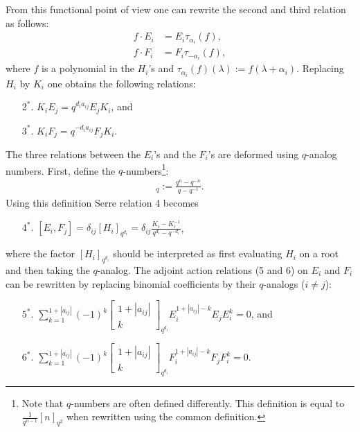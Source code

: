 \begin{construct}
        From this functional point of view one can rewrite the second and third relation as follows:
        \begin{align*}
            f\cdot E_i &= E_i\tau_{\alpha_i}(f),\\
            f\cdot F_i &= F_i\tau_{-\alpha_i}(f),
        \end{align*}
        where $f$ is a polynomial in the $H_i$'s and $\tau_{\alpha_i}(f)(\lambda) := f(\lambda+\alpha_i)$. Replacing $H_i$ by $K_i$ one obtains the following relations:
        \begin{enumerate}
            \item[$2^*.$] $K_iE_j = q^{d_ia_{ij}}E_jK_i$, and
            \item[$3^*.$] $K_iF_j = q^{-d_ia_{ij}}F_jK_i$.
        \end{enumerate}
        The three relations between the $E_i$'s and the $F_i$'s are deformed using $q$-analog numbers. First, define the $q$-numbers\footnote{Note that $q$-numbers are often defined differently. This definition is equal to $\frac{1}{q^{n-1}}[n]_{q^2}$ when rewritten using the common definition.}:
        \begin{gather}
            [n]_q := \frac{q^n - q^{-n}}{q - q^{-1}}.
        \end{gather}
        Using this definition Serre relation 4 becomes
        \begin{enumerate}
            \item[$4^*.$] $[E_i,F_j] = \delta_{ij}[H_i]_{q^{d_i}} = \delta_{ij}\frac{K_i - K_i^{-1}}{q^{d_i} - q^{-d_i}}$,
        \end{enumerate}
        where the factor $[H_i]_{q^{d_i}}$ should be interpreted as first evaluating $H_i$ on a root and then taking the $q$-analog. The adjoint action relations (5 and 6) on $E_i$ and $F_i$ can be rewritten by replacing binomial coefficients by their $q$-analogs ($i\neq j$):
        \begin{enumerate}
            \item[$5^*.$] $\sum_{k=1}^{1+|a_{ij}|} (-1)^k\begin{bmatrix}1+|a_{ij}|\\k\end{bmatrix}_{q^{d_i}}E_i^{1+|a_{ij}|-k}E_jE_i^k = 0$, and
            \item[$6^*.$] $\sum_{k=1}^{1+|a_{ij}|} (-1)^k\begin{bmatrix}1+|a_{ij}|\\k\end{bmatrix}_{q^{d_i}}F_i^{1+|a_{ij}|-k}F_jF_i^k = 0$.
        \end{enumerate}
    \end{construct}

